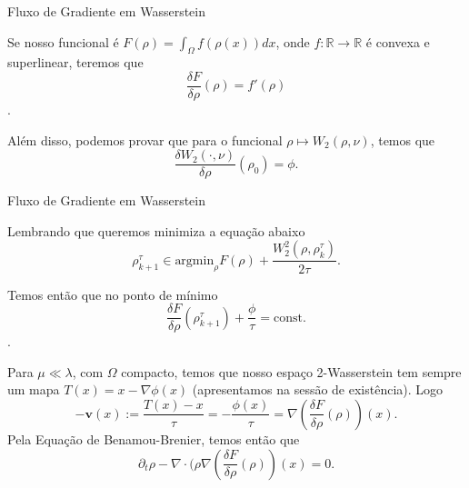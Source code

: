 \documentclass[10pt]{beamer}
\begin{document}
\begin{frame}[fragile]{Fluxo de Gradiente em Wasserstein}

	Se nosso funcional é $F(\rho)=\int_\Omega f(\rho(x))dx$, onde $f:\mathbb R \to \mathbb R$
	é convexa e superlinear, teremos que
	\begin{equation}
		\frac{\delta F}{\delta \rho}(\rho) = f'(\rho)
	\end{equation}.

	Além disso, podemos provar que para o funcional $\rho \mapsto W_2(\rho, \nu)$, temos que
	\begin{equation}
		\frac{\delta W_2(\cdot,\nu)}{\delta \rho}(\rho_0) = \phi.
	\end{equation}

\end{frame}

\begin{frame}[fragile]{Fluxo de Gradiente em Wasserstein}

	Lembrando que queremos minimiza a equação abaixo
	\begin{equation}
		\rho_{k+1}^\tau \in \text{argmin}_{\rho} F(\rho)+\frac{W_2^2(\rho,\rho_k^\tau)}{2\tau}.
	\end{equation}

	Temos então que no ponto de mínimo
	\begin{equation}
		\frac{\delta F}{\delta \rho}(\rho_{k+1}^\tau) + \frac{\phi}{\tau} = \text{const}.
	\end{equation}.

	Para $\mu\ll \lambda$, com $\Omega$ compacto, temos que nosso espaço 2-Wasserstein
	tem sempre um mapa $T(x) = x - \nabla \phi(x)$ (apresentamos na sessão de existência). Logo
	\begin{equation}
		-\bm{v}(x):= \frac{T(x)-x}{\tau} = -\frac{\phi(x)}{\tau} =
		\nabla (\frac{\delta F}{\delta \rho}(\rho))(x).
	\end{equation}
	Pela Equação de Benamou-Brenier, temos então que
	\begin{equation}
		\partial_t \rho - \nabla \cdot (\rho \nabla (\frac{\delta F}{\delta \rho}(\rho))(x) = 0.
	\end{equation}

\end{frame}
\end{document}

